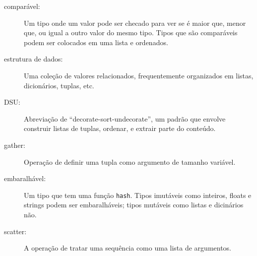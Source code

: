 \begin{description}

\item[comparável:] Um tipo onde um valor pode ser checado para ver se é maior
que, menor que, ou igual a outro valor do mesmo tipo. Tipos que são
comparáveis podem ser colocados em uma lista e ordenados.

\item[estrutura de dados:] Uma coleção de valores relacionados, frequentemente
organizados em listas, dicionários, tuplas, etc.

\item[DSU:] Abreviação de ``decorate-sort-undecorate'', um padrão que envolve
construir listas de tuplas, ordenar, e extrair parte do conteúdo.

\item[gather:] Operação de definir uma tupla como argumento de tamanho
variável.

\item[embaralhável:] Um tipo que tem uma função {\tt hash}. Tipos imutáveis
como inteiros, floats e strings podem ser embaralháveis; tipos mutáveis como
listas e dicinários não.

\item[scatter:] A operação de tratar uma sequência como uma lista de
argumentos.


\end{description}
